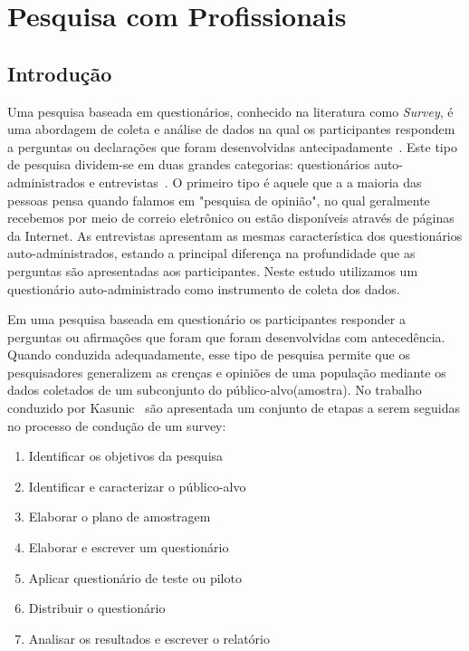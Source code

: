 \chapter{Pesquisa com Profissionais}
\label{ch:pesquisa-profissionais}

\section{Introdução}
\label{sec:pesquisa-profissionais-intro}

Uma pesquisa baseada em questionários, conhecido na literatura como
\textit{Survey}, é uma abordagem de coleta e análise de dados na qual os
participantes respondem a perguntas ou declarações que foram desenvolvidas
antecipadamente~\cite{kasunic2005designing}. Este tipo de pesquisa
dividem-se em duas grandes categorias: questionários auto-administrados e
entrevistas~\cite{kasunic2005designing}. O primeiro tipo é aquele que a a
maioria das pessoas pensa quando falamos em "pesquisa de opinião", no qual
geralmente recebemos por meio de correio eletrônico ou estão disponíveis através
de páginas da Internet. As entrevistas apresentam as mesmas característica dos
questionários auto-administrados, estando a principal diferença na profundidade
que as perguntas são apresentadas aos participantes.  Neste estudo utilizamos
um questionário auto-administrado como instrumento de coleta dos dados.

Em uma pesquisa baseada em questionário os participantes responder a perguntas
ou afirmações que foram que foram desenvolvidas com antecedência. Quando
conduzida adequadamente, esse tipo de pesquisa permite que os pesquisadores
generalizem as crenças e opiniões de uma população mediante os dados
coletados de um subconjunto do público-alvo(amostra). No trabalho conduzido por
Kasunic~\cite{kasunic2005designing} são apresentada um conjunto de etapas a
serem seguidas no processo de condução de um survey:

\begin{enumerate}
\item{Identificar os objetivos da pesquisa}
\item{Identificar e caracterizar o público-alvo}
\item{Elaborar o plano de amostragem}
\item{Elaborar e escrever um questionário}
\item{Aplicar questionário de teste ou piloto}
\item{Distribuir o questionário}
\item{Analisar os resultados e escrever o relatório}
\end{enumerate}

